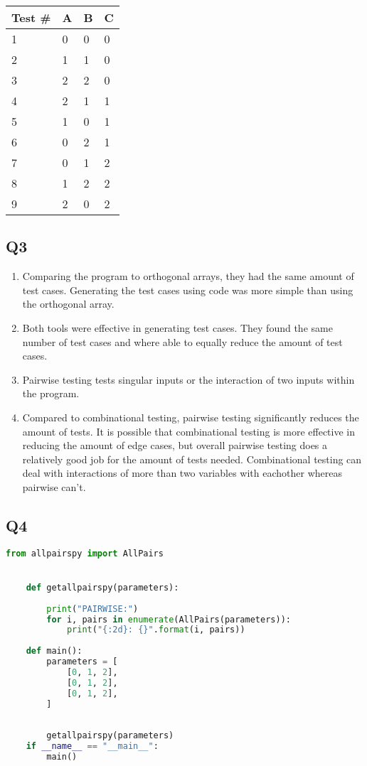 \documentclass[12pt, letterpaper, titlepage]{article}
\begin{document}
\begin{centering}
    \begin{tabularx}{\textwidth}{|X|X|X|X|}
        \caption{Test cases generated using allpairspy} \\ \hline
        Test \# & A & B & C \\ \hline
        1 & 0 & 0 & 0 \\ \hline
        2 & 1 & 1 & 0 \\ \hline
        3 & 2 & 2 & 0 \\ \hline
        4 & 2 & 1 & 1 \\ \hline
        5 & 1 & 0 & 1 \\ \hline
        6 & 0 & 2 & 1 \\ \hline
        7 & 0 & 1 & 2 \\ \hline
        8 & 1 & 2 & 2 \\ \hline
        9 & 2 & 0 & 2 \\ \hline
    \end{tabularx}
    \end{centering}
\subsection*{Q3}
\begin{enumerate}
    \item Comparing the program to orthogonal arrays, they had the same amount of test cases. Generating the test cases using code was more simple than using the orthogonal array.
    \item Both tools were effective in generating test cases. They found the same number of test cases and where able to equally reduce the amount of test cases.
    \item Pairwise testing tests singular inputs or the interaction of two inputs within the program.
    \item Compared to combinational testing, pairwise testing significantly reduces the amount of tests. It is possible that combinational testing is more effective in reducing the amount of edge cases, but overall pairwise testing does a relatively good job for the amount of tests needed. Combinational testing can deal with interactions of more than two variables with eachother whereas pairwise can't. 
\end{enumerate}

\subsection*{Q4}
\begin{lstlisting}[language=Python, style=code_style]
    from allpairspy import AllPairs


    def getallpairspy(parameters):
    
        print("PAIRWISE:")
        for i, pairs in enumerate(AllPairs(parameters)):
            print("{:2d}: {}".format(i, pairs))
    
    def main():
        parameters = [
            [0, 1, 2],
            [0, 1, 2],
            [0, 1, 2],
        ]
    
    
        getallpairspy(parameters)
    if __name__ == "__main__":
        main()
\end{lstlisting}
\end{document}
